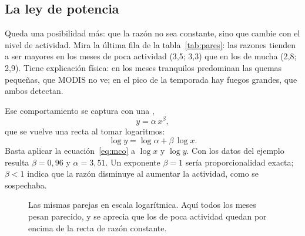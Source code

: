 \subsection{La ley de potencia}

Queda una posibilidad más: que la razón no sea constante, sino que cambie con el nivel de
actividad. Mira la última fila de la tabla~\ref{tab:pares}: las razones tienden a ser mayores en
los meses de poca actividad (3,5; 3,3) que en los de mucha (2,8; 2,9). Tiene explicación física:
en los meses tranquilos predominan las quemas pequeñas, que MODIS no ve; en el pico de la
temporada hay fuegos grandes, que ambos detectan.

Ese comportamiento se captura con una ,
\begin{equation}
  y = \alpha\,x^{\beta},
\end{equation}
que se vuelve una recta al tomar logaritmos:
\begin{equation}
  \log y = \log\alpha + \beta\,\log x .
\end{equation}
Basta aplicar la ecuación~\eqref{eq:mco} a $\log x$ y $\log y$. Con los datos del ejemplo
resulta $\beta = 0{,}96$ y $\alpha = 3{,}51$. Un exponente $\beta = 1$ sería proporcionalidad
exacta; $\beta < 1$ indica que la razón disminuye al aumentar la actividad, como se sospechaba.

\begin{figure}[ht]
\centering
{}
\caption{Las mismas parejas en escala logarítmica. Aquí todos los meses pesan parecido, y se
aprecia que los de poca actividad quedan por encima de la recta de razón constante.}
\label{fig:loglog}
\end{figure}

